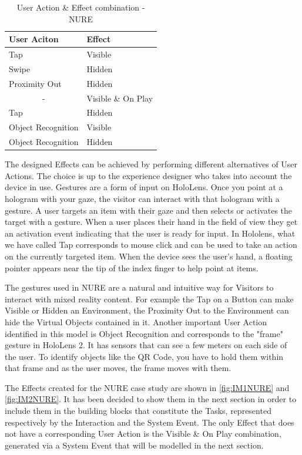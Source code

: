 \begin{table}[h]
\centering
\begin{tabular}{|l|l|}
\hline
\textbf{User Aciton}    & \textbf{Effect}    \\ \hline
Tap                     & Visible            \\ \hline
Swipe                   & Hidden             \\ \hline
Proximity Out           & Hidden             \\ \hline
\multicolumn{1}{|c|}{-} & Visible \& On Play \\ \hline
Tap                     & Hidden             \\ \hline
Object Recognition      & Visible            \\ \hline
Object Recognition      & Hidden             \\ \hline
\end{tabular}
\caption{User Action \& Effect combination - NURE}
\label{tab:UAENURE}
\end{table}

The designed Effects can be achieved by performing different alternatives of User Actions. The choice is up to the experience designer who takes into account the device in use. Gestures are a form of input on HoloLens. Once you point at a hologram with your gaze, the visitor can interact with that hologram with a gesture. A user targets an item with their gaze and then selects or activates the target with a gesture. When a user places their hand in the field of view they get an activation event indicating that the user is ready for input.
In Hololens, what we have called Tap corresponds to mouse click and can be used to take an action on the currently targeted item. When the device sees the user's hand, a floating pointer appears near the tip of the index finger to help point at items. 

The gestures used in NURE are a natural and intuitive way for Visitors to interact with mixed reality content. For example the Tap on a Button can make Visible or Hidden an Environment, the Proximity Out to the Environment can hide the Virtual Objects contained in it. Another important User Action identified in this model is Object Recognition and corresponds to the "frame" gesture in HoloLens 2. It has sensors that can see a few meters on each side of the user. To identify objects like the QR Code, you have to hold them within that frame and as the user moves, the frame moves with them. 

The Effects created for the NURE case study are shown in \autoref{fig:IM1NURE} and \autoref{fig:IM2NURE}. It has been decided to show them in the next section in order to include them in the building blocks that constitute the Tasks, represented respectively by the Interaction and the System Event. 
The only Effect that does not have a corresponding User Action is the Visible \& On Play combination, generated via a System Event that will be modelled in the next section. 


